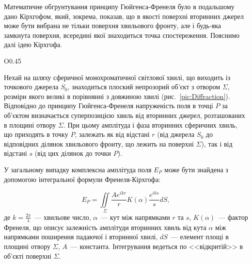 Математичне обгрунтування принципу Гюйгенса-Френеля було в подальшому дано Кірхгофом, який, зокрема, показав, що в якості поверхні вторинних джерел може бути вибрана не тільки поверхня хвильового фронту, але і будь-яка замкнута поверхня, всередині якої знаходиться точка спостереження. Пояснимо далі ідею Кірхгофа.

\begin{wrapfigure}[13]{O}{0.45\linewidth}
    \centering
    \caption{Ілюстрація}
    \label{pic:Diffraction}
\end{wrapfigure}
Нехай на шляху сферичної монохроматичної світлової хвилі, що виходить із точкового джерела $S_0$, знаходиться плоский непрозорий об'єкт з отвором $\Sigma$, розміри якого великі в порівнянні з довжиною хвилі (рис.~\ref{pic:Diffraction}). Відповідно до принципу Гюйгенса-Френеля напруженість поля в точці $P$ за об'єктом визначається суперпозицією хвиль від вторинних джерел, розташованих в площині отвору $\Sigma$. При цьому амплітуда і фаза вторинних
сферичних хвиль, що приходять в точку $P$, залежать як від відстані $r$ (від джерела $S_0$ до відповідних ділянок хвильового фронту, що лежить на поверхні $\Sigma$), так і від відстані $s$ (від цих ділянок до точки $P$).

У загальному випадку комплексна амплітуда поля $E_P$ може бути знайдена з
допомогою інтегральної формули Френеля-Кірхгофа:

\begin{equation}\label{eq:Fr-Kirch}
    E_P = \iint\limits_{\Sigma}  \frac{A e^{ikr}}{r}K(\alpha) \frac{e^{iks}}{s} dS,
\end{equation}
де $k = \frac{2\pi}{\lambda}$~--- хвильове число, $\alpha$~--- кут між напрямками $r$ та $s$, $K(\alpha)$~--- фактор Френеля, що описує залежність амплітуди вторинних хвиль від кута $\alpha$ між напрямками поширення падаючої і вторинної хвилі, $dS$~--- елемент площі в площині отвору $\Sigma$,  $A$~--- константа. Інтегрування ведеться по <<відкритій>> в об'єкті поверхні $\Sigma$.

